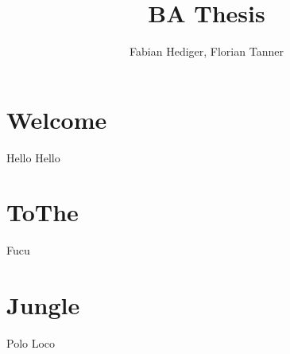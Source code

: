 




% 
% 



\title{BA Thesis}
\author{Fabian Hediger, Florian Tanner}

\setcounter{page}{1}



\section{Welcome}
Hello Hello \cite{IEEEexample:article_typical}

\section{ToThe}
Fucu \cite{mirrorcle_userguide}

\section{Jungle}
Polo Loco \cite{microchip_spi} \cite{verryUseFulArticle}





